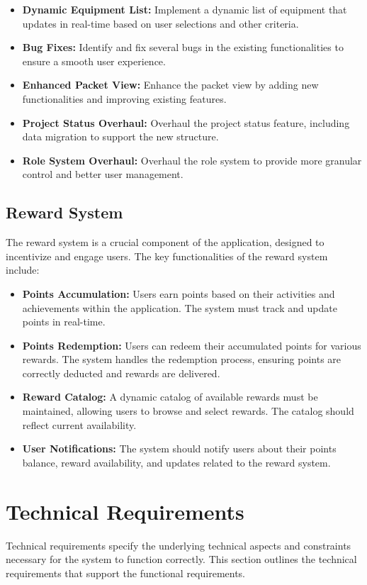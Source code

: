\begin{itemize}
    \item \textbf{Dynamic Equipment List:} Implement a dynamic list of equipment that updates in real-time based on user selections and other criteria.
    \item \textbf{Bug Fixes:} Identify and fix several bugs in the existing functionalities to ensure a smooth user experience.
    \item \textbf{Enhanced Packet View:} Enhance the packet view by adding new functionalities and improving existing features.
    \item \textbf{Project Status Overhaul:} Overhaul the project status feature, including data migration to support the new structure.
    \item \textbf{Role System Overhaul:} Overhaul the role system to provide more granular control and better user management.
\end{itemize}

\subsection{Reward System}
The reward system is a crucial component of the application, designed to incentivize and engage users. The key functionalities of the reward system include:

\begin{itemize}
    \item \textbf{Points Accumulation:} Users earn points based on their activities and achievements within the application. The system must track and update points in real-time.
    \item \textbf{Points Redemption:} Users can redeem their accumulated points for various rewards. The system handles the redemption process, ensuring points are correctly deducted and rewards are delivered.
    \item \textbf{Reward Catalog:} A dynamic catalog of available rewards must be maintained, allowing users to browse and select rewards. The catalog should reflect current availability.
    \item \textbf{User Notifications:} The system should notify users about their points balance, reward availability, and updates related to the reward system.
\end{itemize}



\section{Technical Requirements}
Technical requirements specify the underlying technical aspects and constraints necessary for the system to function correctly. This section outlines the technical requirements that support the functional requirements.

